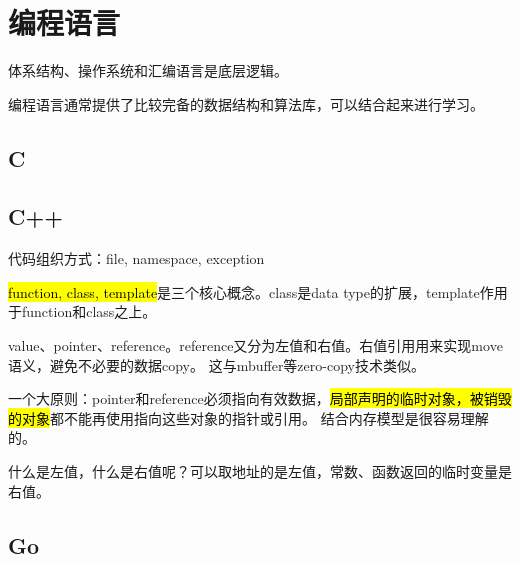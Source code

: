 \chapter{编程语言}

体系结构、操作系统和汇编语言是底层逻辑。

编程语言通常提供了比较完备的数据结构和算法库，可以结合起来进行学习。

\section{C}

\section{C++}

代码组织方式：file, namespace, exception

\hl{function, class, template}是三个核心概念。class是data type的扩展，template作用于function和class之上。

value、pointer、reference。reference又分为左值和右值。右值引用用来实现move语义，避免不必要的数据copy。
这与mbuffer等zero-copy技术类似。

一个大原则：pointer和reference必须指向有效数据，\hl{局部声明的临时对象，被销毁的对象}都不能再使用指向这些对象的指针或引用。
结合内存模型是很容易理解的。

什么是左值，什么是右值呢？可以取地址的是左值，常数、函数返回的临时变量是右值。

\section{Go}
